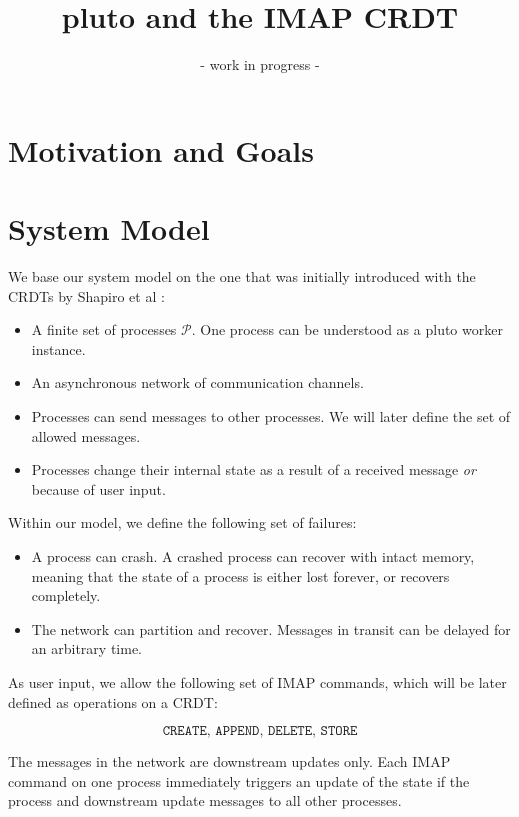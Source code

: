 \documentclass[a4paper]{scrartcl}
\title{pluto and the IMAP CRDT}
\author{- work in progress -}
\begin{document}
\date{}
\maketitle


\section{Motivation and Goals}

\section{System Model}\label{sec:sysmodel}
We base our system model on the one that was initially introduced with
the CRDTs by Shapiro et al \cite{shapiro_crdt}:

\begin{itemize}
  \item A finite set of processes $\mathcal{P}$. One process can be understood
  as a pluto worker instance.
  \item An asynchronous network of communication channels.
  \item Processes can send messages to other processes. We will later define the
  set of allowed messages.
  \item Processes change their internal state as a result of a received message
  \emph{or} because of user input.
\end{itemize}

Within our model, we define the following set of failures:

\begin{itemize}
  \item A process can crash. A crashed process can recover with intact memory,
  meaning that the state of a process is either lost forever, or
  recovers completely.
  \item The network can partition and recover. Messages in transit can be
  delayed for an arbitrary time.
\end{itemize}

As user input, we allow the following set of IMAP commands, which will be later
defined as operations on a CRDT:

\[\texttt{CREATE, APPEND, DELETE, STORE}\]

The messages in the network are downstream updates only. Each IMAP command on
one process immediately triggers an update of the state if the process and
downstream update messages to all other processes.
\end{document}
